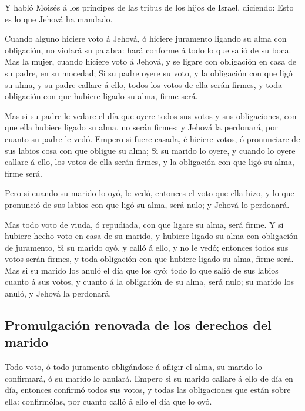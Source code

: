  Y habló Moisés á los príncipes de las tribus de los hijos
de Israel, diciendo: Esto es lo que Jehová ha mandado.

 Cuando alguno hiciere voto á Jehová, ó hiciere juramento
ligando su alma con obligación, no violará su palabra: hará conforme á
todo lo que salió de su boca.  Mas la mujer, cuando
hiciere voto á Jehová, y se ligare con obligación en casa de su padre,
en su mocedad;  Si su padre oyere su voto, y la obligación
con que ligó su alma, y su padre callare á ello, todos los votos de ella
serán firmes, y toda obligación con que hubiere ligado su alma, firme
será.

 Mas si su padre le vedare el día que oyere todos sus
votos y sus obligaciones, con que ella hubiere ligado su alma, no serán
firmes; y Jehová la perdonará, por cuanto su padre le vedó.
 Empero si fuere casada, é hiciere votos, ó pronunciare de
sus labios cosa con que obligue su alma;  Si su marido lo
oyere, y cuando lo oyere callare á ello, los votos de ella serán firmes,
y la obligación con que ligó su alma, firme será.

 Pero si cuando su marido lo oyó, le vedó, entonces el
voto que ella hizo, y lo que pronunció de sus labios con que ligó su
alma, será nulo; y Jehová lo perdonará.

 Mas todo voto de viuda, ó repudiada, con que ligare su
alma, será firme.  Y si hubiere hecho voto en casa de su
marido, y hubiere ligado su alma con obligación de juramento,
 Si su marido oyó, y calló á ello, y no le vedó; entonces
todos sus votos serán firmes, y toda obligación con que hubiere ligado
su alma, firme será.  Mas si su marido los anuló el día
que los oyó; todo lo que salió de sus labios cuanto á sus votos, y
cuanto á la obligación de su alma, será nulo; su marido los anuló, y
Jehová la perdonará.

\hypertarget{promulgaciuxf3n-renovada-de-los-derechos-del-marido}{%
\subsection{Promulgación renovada de los derechos del
marido}\label{promulgaciuxf3n-renovada-de-los-derechos-del-marido}}

 Todo voto, ó todo juramento obligándose á afligir el
alma, su marido lo confirmará, ó su marido lo anulará. 
Empero si su marido callare á ello de día en día, entonces confirmó
todos sus votos, y todas las obligaciones que están sobre ella:
confirmólas, por cuanto calló á ello el día que lo oyó.

